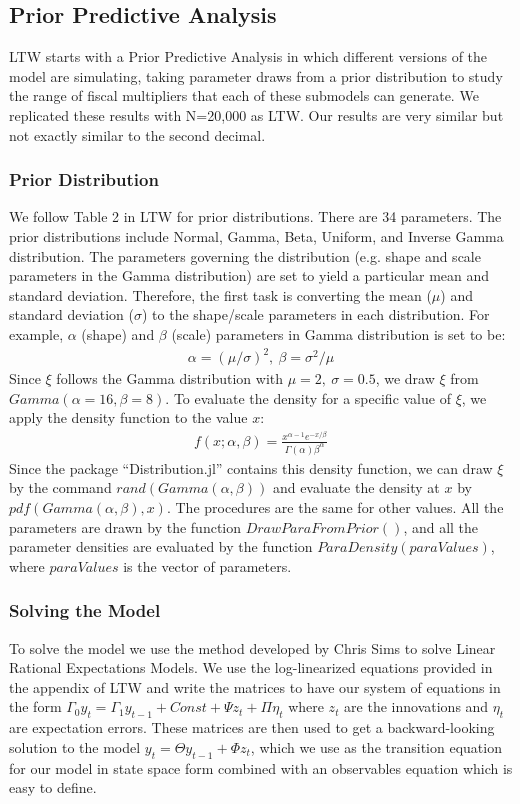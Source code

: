 \documentclass[letterpaper,12pt]{article}%
\begin{document}
\subsection{Prior Predictive Analysis}

LTW starts with a Prior Predictive Analysis in which different versions of the model are simulating, taking parameter draws from a prior distribution to study the range of fiscal multipliers that each of these submodels can generate. We replicated these results with N=20,000 as LTW. Our results are very similar but not exactly similar to the second decimal.

\subsubsection*{Prior Distribution}
We follow Table 2 in LTW for prior distributions. There are 34 parameters. The prior distributions include Normal, Gamma, Beta, Uniform, and Inverse Gamma distribution. The parameters  governing the distribution (e.g. shape and scale parameters in the Gamma distribution) are set to yield a particular mean and standard deviation. Therefore, the first task is converting the mean ($\mu$) and standard deviation ($\sigma$) to the shape/scale parameters in each distribution. For example, $\alpha$ (shape) and $\beta$ (scale) parameters in Gamma distribution is set to be:
\begin{align*}
\alpha = \left( \mu/\sigma  \right)^2, \ \beta = \sigma^2/\mu 
\end{align*}
Since $\xi$ follows the Gamma distribution with $\mu=2, \ \sigma=0.5$, we draw $\xi$ from $Gamma(\alpha=16, \beta=8)$. To evaluate the density for a specific value of $\xi$, we apply the density function to the value $x$:
\begin{align*}
f(x; \alpha, \beta) = \frac{x^{\alpha-1}  e^{-x/\beta }}{\Gamma(\alpha) \beta^\alpha}
\end{align*}
Since the package ``Distribution.jl'' contains this density function, we can draw $\xi$ by the command $rand(Gamma(\alpha,\beta))$ and evaluate the density at $x$ by $pdf(Gamma(\alpha,\beta), x )$. The procedures are the same for other values. All the parameters are drawn by the function $DrawParaFromPrior( )$, and all the parameter densities are evaluated by the function $ParaDensity(paraValues )$, where $paraValues$ is the vector of parameters.


\subsubsection*{Solving the Model}
To solve the model we use the method developed by Chris Sims to solve Linear Rational Expectations Models. We use the log-linearized equations provided in the appendix of LTW and write the matrices to have our system of equations in the form $\Gamma_0 y_{t}=\Gamma_1 y_{t-1}+Const+\Psi z_t+\Pi \eta_t$ where $z_t$ are the innovations and $\eta_t$ are expectation errors. These matrices are then used to get a backward-looking solution to the model $y_t=\Theta y_{t-1}+ \Phi z_t$, which we use as the transition equation for our model in state space form combined with an observables equation which is easy to define. 
\end{document}
